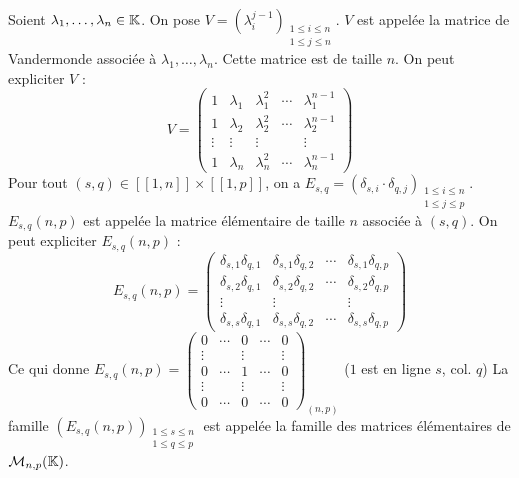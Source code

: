 \documentclass[12pt, a4paper]{report}
\begin{document}
\begin{example}
    \begin{outline}
        \1 Soient $\lambda_1,\dots,\lambda_n \in \mathbb{K}$. On pose $V = \left(\lambda_{i}^{j-1}\right)_{\substack{1 \leq i \leq n\\ 1\leq j \leq n}}$. $V$ est appelée la matrice de Vandermonde associée à $\lambda_1,\dots,\lambda_n$. Cette matrice est de taille $n$.
        \2 On peut expliciter $V$ :
        $$V = \left(\begin{matrix}
1 & \lambda_1 & \lambda_1^2 & \cdots & \lambda_1^{n-1}
\\
1 & \lambda_2 & \lambda_2^2 & \cdots & \lambda_2^{n-1}
\\
\vdots & \vdots & \vdots & & \vdots
\\
1 & \lambda_n & \lambda_n^2 & \cdots & \lambda_n^{n-1}
\end{matrix}\right)$$
        \1 Pour tout $(s,q) \in [\![1,n]\!] \times [\![1,p]\!]$, on a $E_{s,q} = (\delta_{s,i}\cdot \delta_{q,j})_{\substack{1 \leq i \leq n\\ 1\leq j \leq p}}$. $E_{s,q}(n,p)$ est appelée la matrice élémentaire de taille $n$ associée à $(s,q)$.
            \2 On peut expliciter $E_{s,q}(n,p)$ :
            $$E_{s,q}(n,p) = \left(\begin{matrix}
\delta_{s,1}\delta_{q,1} & \delta_{s,1}\delta_{q,2} & \cdots & \delta_{s,1}\delta_{q,p}
\\
\delta_{s,2}\delta_{q,1} & \delta_{s,2}\delta_{q,2} & \cdots & \delta_{s,2}\delta_{q,p}
\\
\vdots & \vdots & & \vdots
\\
\delta_{s,s}\delta_{q,1} & \delta_{s,s}\delta_{q,2} & \cdots & \delta_{s,s}\delta_{q,p}
\end{matrix}\right)$$
            \2 Ce qui donne $E_{s,q}(n,p) = \left(\begin{matrix}
0 & \cdots & 0 & \cdots & 0
\\
\vdots & & \vdots & & \vdots
\\
0 & \cdots & 1 & \cdots & 0
\\
\vdots & & \vdots & & \vdots
\\
0 & \cdots & 0 & \cdots & 0
\end{matrix}\right)_{(n,p)}$ ($1$ est en ligne $s$, col. $q$)
    \2 La famille $(E_{s,q}(n,p))_{\substack{1 \leq s \leq n\\ 1\leq q \leq p}}$ est appelée la famille des matrices élémentaires de $\mathcal M_{n,p}(\mathbb{K})$.
    \end{outline}
\end{example}
\end{document}
